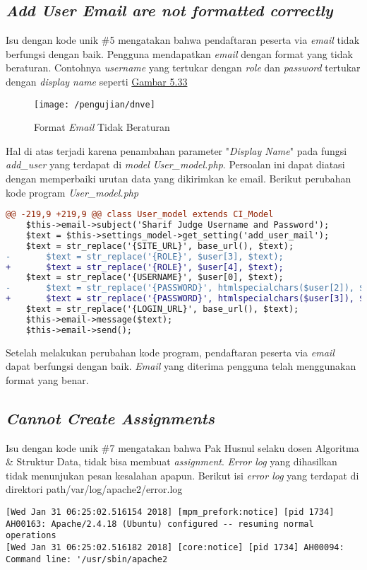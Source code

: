 	\subsection{\textit{Add User Email are not formatted correctly}}
	Isu dengan kode unik \#5 mengatakan bahwa pendaftaran peserta via \textit{email} tidak berfungsi dengan baik. Pengguna mendapatkan \textit{email} dengan format yang tidak beraturan. Contohnya \textit{username} yang tertukar dengan \textit{role} dan \textit{password} tertukar dengan \textit{display name} seperti \hyperref[fig:dnve]{Gambar 5.33} 
	\begin{figure}[H]
		\centering  
		\texttt{[image: /pengujian/dnve]}  
		\caption[Format \textit{Email} Tidak Beraturan]{Format \textit{Email} Tidak Beraturan} 
		\label{fig:dnve} 
	\end{figure}

	Hal di atas terjadi karena penambahan parameter "\textit{Display Name}" pada fungsi \textit{add\_user} yang terdapat di \textit{model User\_model.php}. Persoalan ini dapat diatasi dengan memperbaiki urutan data yang dikirimkan ke email. Berikut perubahan kode program
	\textit{User\_model.php}
\begin{lstlisting}[language=diff, basicstyle=\ttfamily, frame=single,
columns=fullflexible, keepspaces=true, breaklines=true]
@@ -219,9 +219,9 @@ class User_model extends CI_Model
	$this->email->subject('Sharif Judge Username and Password');
	$text = $this->settings_model->get_setting('add_user_mail');
	$text = str_replace('{SITE_URL}', base_url(), $text);
-   	$text = str_replace('{ROLE}', $user[3], $text);
+   	$text = str_replace('{ROLE}', $user[4], $text);
	$text = str_replace('{USERNAME}', $user[0], $text);
-   	$text = str_replace('{PASSWORD}', htmlspecialchars($user[2]), $text);
+   	$text = str_replace('{PASSWORD}', htmlspecialchars($user[3]), $text);
	$text = str_replace('{LOGIN_URL}', base_url(), $text);
	$this->email->message($text);
	$this->email->send();
\end{lstlisting}
	Setelah melakukan perubahan kode program, pendaftaran peserta via \textit{email} dapat berfungsi dengan baik. \textit{Email} yang diterima pengguna telah menggunakan format yang benar.
	
	\subsection{\textit{Cannot Create Assignments}}
	Isu dengan kode unik \#7 mengatakan bahwa Pak Husnul selaku dosen Algoritma \& Struktur Data, tidak bisa membuat \textit{assignment}.\textit{ Error log} yang dihasilkan tidak menunjukan pesan kesalahan apapun. 
	Berikut isi \textit{error log} yang terdapat di direktori path{/var/log/apache2/error.log}
\begin{lstlisting}[basicstyle=\ttfamily, frame=single,columns=fullflexible, keepspaces=true, breaklines=true]
[Wed Jan 31 06:25:02.516154 2018] [mpm_prefork:notice] [pid 1734] AH00163: Apache/2.4.18 (Ubuntu) configured -- resuming normal operations
[Wed Jan 31 06:25:02.516182 2018] [core:notice] [pid 1734] AH00094: Command line: '/usr/sbin/apache2
\end{lstlisting}
	
